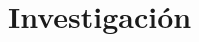 \documentclass[a4paper,12pt]{article}
\begin{document}
\section{Investigación}


\newpage %
\thispagestyle{fancyref}
\printbibliography %
\end{document}
